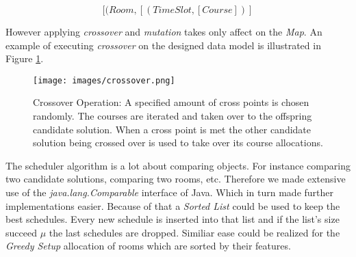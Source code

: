 \[ [(Room,[(TimeSlot,[Course])] \]

However applying \emph{crossover} and \emph{mutation} takes only affect on the \emph{Map}. An example of executing \emph{crossover} on the designed data model is illustrated in Figure \ref{fig:data-model}.

\begin{figure}[H]
\texttt{[image: images/crossover.png]}%
\caption{Crossover Operation: A specified amount of cross points is chosen randomly. The courses are iterated and taken over to the offspring candidate solution. When a cross point is met the other candidate solution being crossed over is used to take over its course allocations.}%
\label{fig:data-model}%
\end{figure}

The scheduler algorithm is a lot about comparing objects. For instance comparing two candidate solutions, comparing two rooms, etc. Therefore we made extensive use of the \emph{java.lang.Comparable} interface of Java. Which in turn made further implementations easier. Because of that a \emph{Sorted List} could be used to keep the best schedules. Every new schedule is inserted into that list and if the list's size succeed $\mu$ the last schedules are dropped. Similiar ease could be realized for the \emph{Greedy Setup} allocation of rooms which are sorted by their features.